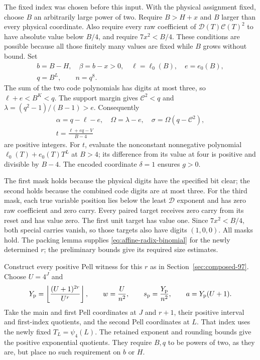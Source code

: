 The fixed index was chosen before this input. With the physical
assignment fixed, choose $B$ an arbitrarily large power of two.
Require $B>H+x$ and $B$ larger than every physical coordinate.
Also require every raw coefficient of
$\mathcal D(T)\mathcal C(T)^2$ to have absolute value below
$B/4$, and require $7x^2<B/4$. These conditions are possible
because all those finitely many values are fixed while $B$
grows without bound. Set
\[
 \begin{gathered}
 b=B-H,\quad\beta=b-x>0,\quad
 \ell=\ell_0(B),\quad e=e_0(B),\\
 q=B^L,\qquad n=q^8.
 \end{gathered}
\]
The sum of the two code polynomials has digits at most three,
so $\ell+e<B^K<q$. The support margin gives
$\mathcal C^2<q$ and $\lambda=(q^2-1)/(B-1)>e$.
Consequently
\[
 \begin{gathered}
 \alpha=q-\ell-e,\quad\Omega=\lambda-e,\quad
 \sigma=\Omega(q-\mathcal C^2),\\
 t=\frac{\ell+eq-V}{B-4}
 \end{gathered}
\]
are positive integers. For $t$, evaluate the nonconstant
nonnegative polynomial $\ell_0(T)+e_0(T)T^L$ at $B>4$;
its difference from its value at four is positive and divisible
by $B-4$. The encoded coordinate $\delta=1$ ensures $g>0$.

The first mask holds because the physical digits have the
specified bit clear; the second holds because the combined
code digits are at most three. For the third mask, each true
variable position lies below the least $\mathcal D$ exponent
and has zero raw coefficient and zero carry. Every paired
target receives zero carry from its reset and has value zero.
The first unit target has value one. Since $7x^2<B/4$,
both special carries vanish, so those targets also have digits
$(1,0,0)$. All masks hold. The packing lemma supplies
\eqref{eq:affine-radix-binomial} for the newly determined $r$;
the preliminary bounds give its required size estimates.

Construct every positive Pell witness for this $r$ as in
Section~\ref{sec:composed-97}. Choose $U=4^J$ and
\[
 Y_{\rm p}=\left\lfloor\frac{(U+1)^{2r}}{U^r}\right\rfloor,
 \qquad w=\frac U{n^2},\qquad
 s_{\rm p}=\frac{Y_{\rm p}}{n^2},\qquad a=Y_{\rm p}(U+1).
\]
Take the main and first Pell coordinates at $J$ and $r+1$,
their positive interval and first-index quotients, and the
second Pell coordinates at $L$. That index uses the newly
fixed $T_L=\psi_4(L)$. The retained exponent and rounding
bounds give the positive exponential quotients. They require
$B,q$ to be powers of two, as they are, but place no such
requirement on $b$ or $H$.

